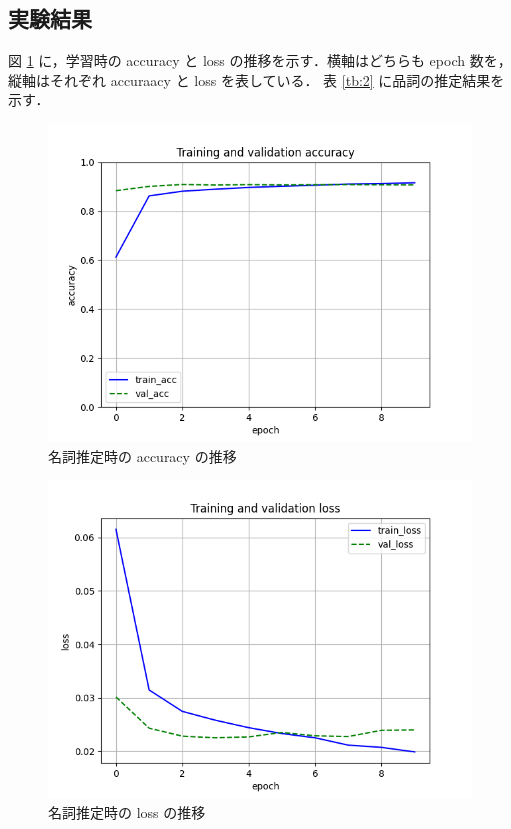 \documentclass[twocolumn]{jarticle}
\begin{document}
\subsection{実験結果}

図 \ref{fig:mei_acc} に，学習時の accuracy と loss の推移を示す．横軸はどちらも epoch 数を，縦軸はそれぞれ accuraacy と loss を表している．
表 \ref{tb:2} に品詞の推定結果を示す．



\begin{figure}[tbp]
      \includegraphics[width=\linewidth]{meishi_acc.png}
      \caption{名詞推定時の accuracy の推移}
      \label{fig:mei_acc}
\end{figure}
\begin{figure}[tbp]
      \includegraphics[width=\linewidth]{meishi_loss.png}
      \caption{名詞推定時の loss の推移}
      \label{fig:mei_loss}
\end{figure}
\end{document}
